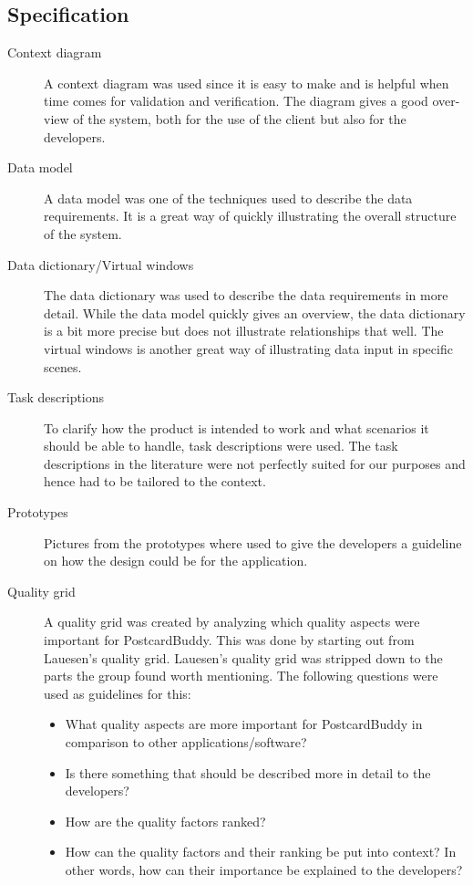 \documentclass[10pt,a4paper]{article}
\begin{document}
\subsection{Specification}

\begin{description}
\item[Context diagram] A context diagram was used since it is easy to make and is helpful when time comes for validation and verification. The diagram gives a good over-view of the system, both for the use of the client but also for the developers. 

\item[Data model] A data model was one of the techniques used to describe the data requirements. It is a great way of quickly illustrating the overall structure of the system. 

\item[Data dictionary/Virtual windows] The data dictionary was used to describe the data requirements in more detail. While the data model quickly gives an overview, the data dictionary is a bit more precise but does not illustrate relationships that well. The virtual windows is another great way of illustrating data input in specific scenes. 

\item[Task descriptions] To clarify how the product is intended to work and what scenarios it should be able to handle, task descriptions were used. The task descriptions in the literature were not perfectly suited for our purposes and hence had to be tailored to the context. 

\item[Prototypes] Pictures from the prototypes where used to give the developers a guideline on how the design could be for the application.

\item[Quality grid]
A quality grid was created by analyzing which quality aspects were important for PostcardBuddy. This was done by starting out from Lauesen's quality grid\cite{soren}. Lauesen's quality grid was stripped down to the parts the group found worth mentioning. The following questions were used as guidelines for this:
\begin{itemize}
\item What quality aspects are more important for PostcardBuddy in comparison to other applications/software?
\item Is there something that should be described more in detail to the developers?
\item How are the quality factors ranked?
\item How can the quality factors and their ranking be put into context? In other words, how can their importance be explained to the developers?
\end{itemize}


\end{description}
\end{document}
